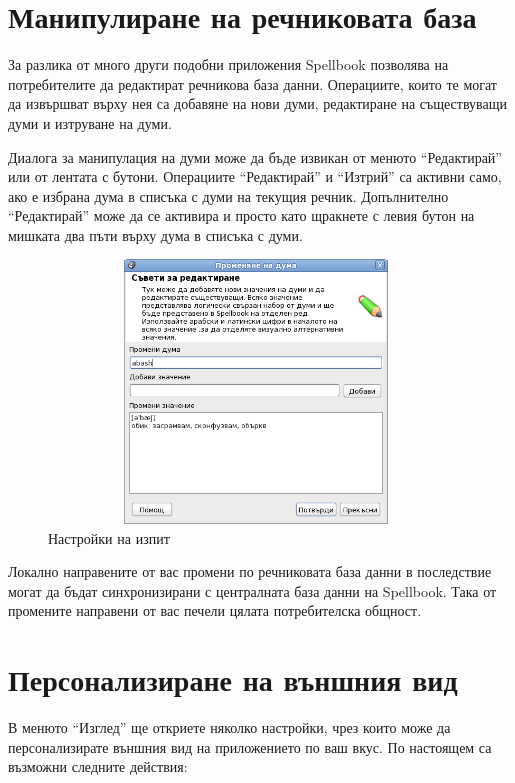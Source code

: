 \section{Манипулиране на речниковата база}
За разлика от много други подобни приложения Spellbook позволява на
потребителите да редактират речникова база данни. Операциите, които те
могат да извършват върху нея са добавяне на нови думи, редактиране на
съществуващи думи и изтруване на думи.

Диалога за манипулация на думи може да бъде извикан от менюто
"`Редактирай"' или от лентата с бутони. Операциите "`Редактирай"' и
"`Изтрий"' са активни само, ако е избрана дума в списъка с думи на
текущия речник. Допълнително "`Редактирай"' може да се активира и
просто като щракнете с левия бутон на мишката два пъти върху дума в
списъка с думи. 

\begin{figure}[htbp]
  \caption{Настройки на изпит}
  \centering
  \includegraphics[width=110mm, height=70mm]{images/edit_word.png}
\end{figure}

Локално направените от вас промени по речниковата база данни в
последствие могат да бъдат синхронизирани с централната база данни на
Spellbook. Така от промените направени от вас печели цялата
потребителска общност.
\section{Персонализиране на външния вид}
В менюто "`Изглед"' ще откриете няколко настройки, чрез които може да
персонализирате външния вид на приложението по ваш вкус. По настоящем
са възможни следните действия:

